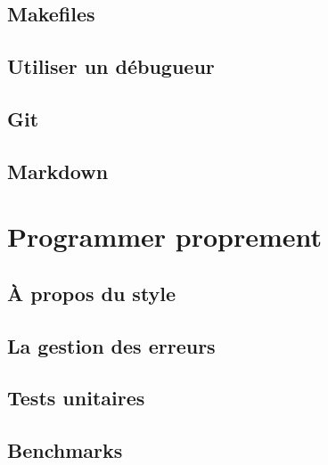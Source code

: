 \documentclass{minitelreport}
\begin{document}
\begin{refsection}
		\section{Makefiles}
			\label{sec:makefiles}
			
		\section{Utiliser un débugueur}
			\label{sec:utiliser_un_d_bugueur}
			
		\section{Git}
			\label{sec:git}
			
		\section{Markdown}
			\label{sec:le_markdown}
			
	\chapter{Programmer proprement}
	\label{chap:programmer_proprement}
		\section{À propos du style}
			\label{sec:_propos_du_style}
			
		\section{La gestion des erreurs}
			\label{sec:la_gestion_des_erreurs}
			
		\section{Tests unitaires}
			\label{sec:tests_unitaires}
			
		\section{Benchmarks}
			\label{sec:benchmarks}
			

\end{refsection}
\end{document}
